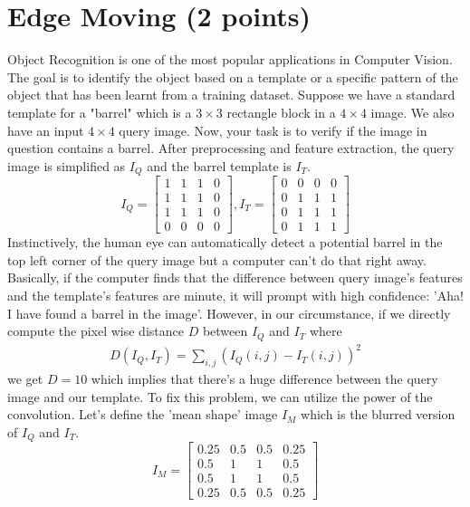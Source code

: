 \section{Edge Moving (2 points)}
Object Recognition is one of the most popular applications in Computer Vision. The goal is to identify the object based on a template or a specific pattern of the object that has been learnt from a training dataset. Suppose we have a standard template for a "barrel" which is a $3 \times 3$ rectangle block in a $4 \times 4$ image. We also have an input $4 \times 4$ query image. Now, your task is to verify if the image in question contains a barrel. After preprocessing and feature extraction, the query image is simplified as $I_{Q}$ and the barrel template is $I_{T}$.
\[ I_{Q}=  \begin{bmatrix}
1 & 1 & 1 & 0 \\
1 & 1 & 1 & 0 \\
1 & 1 & 1 & 0 \\
0 & 0 & 0 & 0 \end{bmatrix}, I_{T}= \begin{bmatrix}
0 & 0 & 0 & 0 \\
0 & 1 & 1 & 1 \\
0 & 1 & 1 & 1 \\
0 & 1 & 1 & 1 \end{bmatrix} \]
Instinctively, the human eye can automatically detect a potential barrel in the top left corner of the query image but a computer can't do that right away. Basically, if the computer finds that the difference between query image's features and the template's features are minute, it will prompt with high confidence: 'Aha! I have found a barrel in the image'. However, in our circumstance, if we directly compute the pixel wise distance $D$ between $I_{Q}$ and $I_{T}$ where
\begin{eqnarray}
D(I_{Q}, I_{T}) = \sum_{i, j}(I_{Q}(i, j)- I_{T}(i, j))^2
\end{eqnarray}
we get $D = 10$ which implies that there's a huge difference between the query image and our template. To fix this problem, we can utilize the power of the convolution.
Let's define the 'mean shape' image $I_M$ which is the blurred version of $I_Q$ and $I_T$. 
\[I_{M}= \begin{bmatrix}
0.25 & 0.5 & 0.5 & 0.25 \\
0.5 & 1 & 1 & 0.5 \\
0.5 & 1 & 1 & 0.5 \\
0.25 & 0.5 & 0.5 & 0.25 \end{bmatrix} \]

